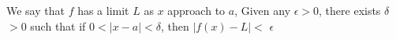 \documentclass[preview]{standalone}
\begin{document}
\begin{center}
We say that $f$ has a limit $L$ as $x$ approach to $a$, Given any $\epsilon > 0$, there exists $\delta$ $ > 0$ such that if $0 < |x - a| < \delta$, then $|f(x) - L| <$ $\epsilon$
\end{center}
\end{document}
